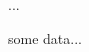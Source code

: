 \documentclass[11pt,twoside,a4paper]{article}
\begin{document}
\begin{landscape}
\begin{multicols}{2}
	\vfill
	
	\columnbreak
	
	\tableofcontents
	
	\vfill
	
	\columnbreak
	
	
	...
	
	some data... 
\end{multicols}

\clearpage

\end{landscape}
\end{document}
